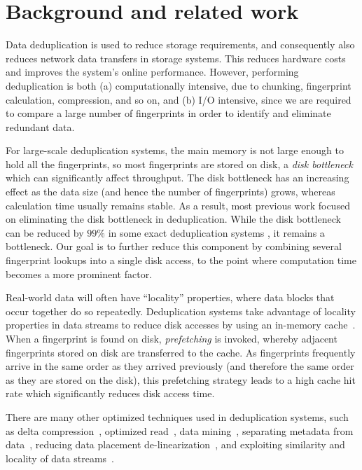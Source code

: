 \documentclass[prodmode,acmtecs]{acmsmall}
\begin{document}
\section{Background and related work}\label{se:back}

Data deduplication is used to reduce storage requirements, and consequently also reduces network data transfers in storage systems.  This reduces hardware costs and improves the system's online performance.  However, performing deduplication is both (a) computationally intensive, due to chunking, fingerprint calculation, compression, and so on, and (b) I/O intensive, since we are required to compare a large number of fingerprints in order to identify and eliminate redundant data.

For large-scale deduplication systems, the main memory is not large enough to hold all the fingerprints, so most fingerprints are stored on disk, a \emph{disk bottleneck} which can significantly affect throughput. The disk bottleneck has an increasing effect as the data size (and hence the number of fingerprints) grows, whereas calculation time usually remains stable.  As a result, most previous work focused on eliminating the disk bottleneck in deduplication.  While the disk bottleneck can be reduced by $99\%$ in some exact deduplication systems \cite{zhu2008avoiding}, it remains a bottleneck.  Our goal is to further reduce this component by combining several fingerprint lookups into a single disk access, to the point where computation time becomes a more prominent factor.

Real-world data will often have ``locality'' properties, where data blocks that occur together do so repeatedly.  Deduplication systems take advantage of locality properties in data streams to reduce disk accesses by using an in-memory cache~\cite{zhu2008avoiding,guo2011building,lillibridge2009sparse,bhagwat2009extreme,xia2011silo,srinivasan2012idedup,Botelho2013fast}.  When a fingerprint is found on disk, \emph{prefetching} is invoked, whereby adjacent fingerprints stored on disk are transferred to the cache. As fingerprints frequently arrive in the same order as they arrived previously (and therefore the same order as they are stored on the disk), this prefetching strategy leads to a high cache hit rate which significantly reduces disk access time.

There are many other optimized techniques used in deduplication systems, such as delta compression~\cite{Shilane2012WanOpt}, optimized read~\cite{Ng2013RevDedup,Mao2014readOpt}, data mining~\cite{Fu2014ATC}, separating metadata from data~\cite{Lin2015hotstorage}, reducing data placement de-linearization~\cite{Tan2015defrag}, and exploiting similarity and locality of data streams~\cite{Xia2015}.
\end{document}
